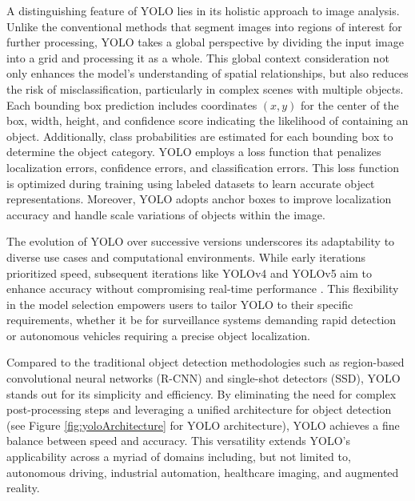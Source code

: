 A distinguishing feature of YOLO lies in its holistic approach to image analysis. Unlike the conventional methods that segment images into regions of interest for further processing, YOLO takes a global perspective by dividing the input image into a grid and processing it as a whole. This global context consideration not only enhances the model's understanding of spatial relationships, but also reduces the risk of misclassification, particularly in complex scenes with multiple objects. Each bounding box prediction includes coordinates $(x, y)$ for the center of the box, width, height, and confidence score indicating the likelihood of containing an object. Additionally, class probabilities are estimated for each bounding box to determine the object category. YOLO employs a loss function that penalizes localization errors, confidence errors, and classification errors.
This loss function is optimized during training using labeled datasets to learn accurate object representations. Moreover, YOLO adopts anchor boxes to improve localization accuracy and handle scale variations of objects within the image.

The evolution of YOLO over successive versions underscores its adaptability to diverse use cases and computational environments. While early iterations prioritized speed, subsequent iterations like YOLOv4 and YOLOv5 aim to enhance accuracy without compromising real-time performance \cite{YoloVersions2022}. This flexibility in the model selection empowers users to tailor YOLO to their specific requirements, whether it be for surveillance systems demanding rapid detection or autonomous vehicles requiring a precise object localization.

Compared to the traditional object detection methodologies such as region-based convolutional neural networks (R-CNN) \cite{MaskRCNN2017} and single-shot detectors (SSD), YOLO stands out for its simplicity and efficiency. By eliminating the need for complex post-processing steps and leveraging a unified architecture for object detection (see Figure \ref{fig:yoloArchitecture} for YOLO architecture), YOLO achieves a fine balance between speed and accuracy. This versatility extends YOLO's applicability across a myriad of domains including, but not limited to, autonomous driving, industrial automation, healthcare imaging, and augmented reality.

